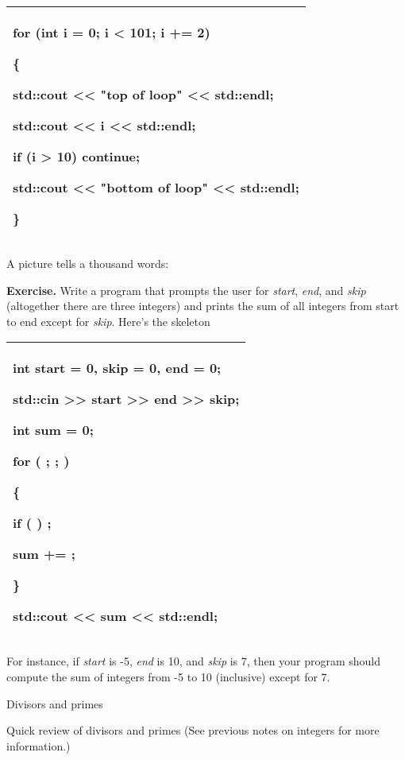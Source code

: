 \documentclass[
]{article}
\begin{document}
\begin{longtable}[]{@{}l@{}}
\toprule
\endhead
\begin{minipage}[t]{0.97\columnwidth}\raggedright
for (int i = 0; i \textless{} 101; i += 2)

\{

std::cout \textless\textless{} "top of loop" \textless\textless{}
std::endl;

std::cout \textless\textless{} i \textless\textless{} std::endl;

if (i \textgreater{} 10) continue;

std::cout \textless\textless{} "bottom of loop" \textless\textless{}
std::endl;

\}\strut
\end{minipage}\tabularnewline
\bottomrule
\end{longtable}

A picture tells a thousand words:

\textbf{Exercise.} Write a program that prompts the user for
\emph{start}, \emph{end}, and \emph{skip} (altogether there are three
integers) and prints the sum of all integers from start to end except
for \emph{skip}. Here's the skeleton

\begin{longtable}[]{@{}l@{}}
\toprule
\endhead
\begin{minipage}[t]{0.97\columnwidth}\raggedright
int start = 0, skip = 0, end = 0;

std::cin \textgreater\textgreater{} start \textgreater\textgreater{} end
\textgreater\textgreater{} skip;

int sum = 0;

for ( ; ; )

\{

if ( ) ;

sum += ;

\}

std::cout \textless\textless{} sum \textless\textless{} std::endl;
\strut
\end{minipage}\tabularnewline
\bottomrule
\end{longtable}

For instance, if \emph{start} is -5, \emph{end} is 10, and \emph{skip}
is 7, then your program should compute the sum of integers from -5 to 10
(inclusive) except for 7.

Divisors and primes

Quick review of divisors and primes (See previous notes on integers for
more information.)
\end{document}
